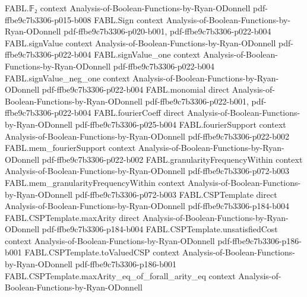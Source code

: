 \begin{theorem}
\label{FABL.seven_eighths_le_optimum_maxE3Sat}
\leanok
{}
\proofstep
  {FABL.𝔽₂}
  {context}
  {Analysis-of-Boolean-Functions-by-Ryan-ODonnell}
  {pdf-ffbe9c7b3306-p015-b008}
\proofstep
  {FABL.Sign}
  {context}
  {Analysis-of-Boolean-Functions-by-Ryan-ODonnell}
  {pdf-ffbe9c7b3306-p020-b001,
    pdf-ffbe9c7b3306-p022-b004}
\proofstep
  {FABL.signValue}
  {context}
  {Analysis-of-Boolean-Functions-by-Ryan-ODonnell}
  {pdf-ffbe9c7b3306-p022-b004}
\proofstep
  {FABL.signValue_one}
  {context}
  {Analysis-of-Boolean-Functions-by-Ryan-ODonnell}
  {pdf-ffbe9c7b3306-p022-b004}
\proofstep
  {FABL.signValue_neg_one}
  {context}
  {Analysis-of-Boolean-Functions-by-Ryan-ODonnell}
  {pdf-ffbe9c7b3306-p022-b004}
\proofstep
  {FABL.monomial}
  {direct}
  {Analysis-of-Boolean-Functions-by-Ryan-ODonnell}
  {pdf-ffbe9c7b3306-p022-b001,
    pdf-ffbe9c7b3306-p022-b004}
\proofstep
  {FABL.fourierCoeff}
  {direct}
  {Analysis-of-Boolean-Functions-by-Ryan-ODonnell}
  {pdf-ffbe9c7b3306-p025-b004}
\proofstep
  {FABL.fourierSupport}
  {context}
  {Analysis-of-Boolean-Functions-by-Ryan-ODonnell}
  {pdf-ffbe9c7b3306-p022-b002}
\proofstep
  {FABL.mem_fourierSupport}
  {context}
  {Analysis-of-Boolean-Functions-by-Ryan-ODonnell}
  {pdf-ffbe9c7b3306-p022-b002}
\proofstep
  {FABL.granularityFrequencyWithin}
  {context}
  {Analysis-of-Boolean-Functions-by-Ryan-ODonnell}
  {pdf-ffbe9c7b3306-p072-b003}
\proofstep
  {FABL.mem_granularityFrequencyWithin}
  {context}
  {Analysis-of-Boolean-Functions-by-Ryan-ODonnell}
  {pdf-ffbe9c7b3306-p072-b003}
\proofstep
  {FABL.CSPTemplate}
  {direct}
  {Analysis-of-Boolean-Functions-by-Ryan-ODonnell}
  {pdf-ffbe9c7b3306-p184-b004}
\proofstep
  {FABL.CSPTemplate.maxArity}
  {direct}
  {Analysis-of-Boolean-Functions-by-Ryan-ODonnell}
  {pdf-ffbe9c7b3306-p184-b004}
\proofstep
  {FABL.CSPTemplate.unsatisfiedCost}
  {context}
  {Analysis-of-Boolean-Functions-by-Ryan-ODonnell}
  {pdf-ffbe9c7b3306-p186-b001}
\proofstep
  {FABL.CSPTemplate.toValuedCSP}
  {context}
  {Analysis-of-Boolean-Functions-by-Ryan-ODonnell}
  {pdf-ffbe9c7b3306-p186-b001}
\proofstep
  {FABL.CSPTemplate.maxArity_eq_of_forall_arity_eq}
  {context}
  {Analysis-of-Boolean-Functions-by-Ryan-ODonnell}

\end{theorem}
